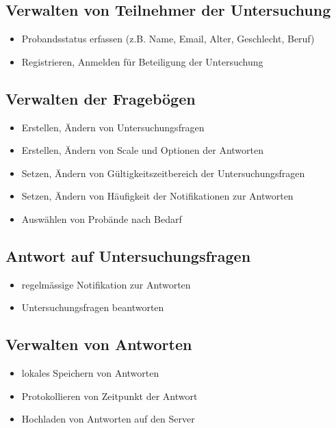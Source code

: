 \documentclass[a4paper]{scrreprt}
\begin{document}
            \subsection{Verwalten von Teilnehmer der Untersuchung}
                \begin{itemize}
                    \item Probandsstatus erfassen (z.B. Name, Email, Alter, Geschlecht, Beruf)
                    \item Registrieren, Anmelden f\"ur Beteiligung der Untersuchung
                \end{itemize}
            
            \subsection{Verwalten der Frageb\"ogen}
                \begin{itemize}
                    \item Erstellen, \"Andern von Untersuchungsfragen
                    \item Erstellen, \"Andern von Scale und Optionen der Antworten
                    \item Setzen, \"Andern von G\"ultigkeitszeitbereich der Untersuchungsfragen
                    \item Setzen, \"Andern von H\"aufigkeit der Notifikationen zur Antworten
                    \item Ausw\"ahlen von Prob\"ande nach Bedarf
                \end{itemize}
            
            \subsection{Antwort auf Untersuchungsfragen}
                \begin{itemize}
                    \item regelm\"assige Notifikation zur Antworten
                    \item Untersuchungsfragen beantworten
                \end{itemize}
                
            \subsection{Verwalten von Antworten}
                \begin{itemize}
                    \item lokales Speichern von Antworten
                    \item Protokollieren von Zeitpunkt der Antwort
                    \item Hochladen von Antworten auf den Server
                \end{itemize}
            
\end{document}
